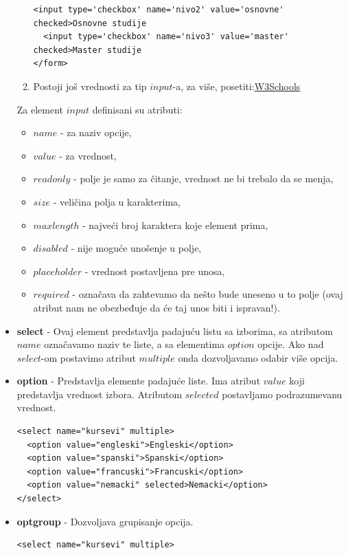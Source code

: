 \begin{itemize}
\begin{enumerate}
\begin{lstlisting}[backgroundcolor = \color{lightgray}, breaklines=true]
  <input type='checkbox' name='nivo2' value='osnovne' checked>Osnovne studije
  <input type='checkbox' name='nivo3' value='master' checked>Master studije
</form>
		\end{lstlisting}
		\item Postoji još vrednosti za tip $input$-a, za više, posetiti:\href{https://www.w3schools.com/html/html_form_input_types.asp	}{W3Schools}
	\end{enumerate}
 	 Za element $input$ definisani su atributi:
 	 \begin{itemize}
 	 \item $name$ - za naziv opcije, 
 	 \item $value$ - za vrednost,
 	 \item $readonly$ - polje je samo za čitanje, vrednost ne bi trebalo da se menja, 
 	 \item $size$ - veličina polja u karakterima, 
 	 \item $maxlength$ - najveći broj karaktera koje element prima,
 	 \item $disabled$ - nije moguće unošenje u polje,
 	 \item $placeholder$ - vrednost postavljena pre unosa,
 	 \item $required$ - označava da zahtevamo da nešto bude uneseno u to polje (ovaj atribut nam ne obezbeđuje da će taj unos biti i ispravan!).
	\end{itemize} 	    
\item \textbf{select} - Ovaj element predstavlja padajuću listu sa izborima, sa atributom $name$ označavamo naziv te liste, a sa elementima $option$ opcije. Ako nad $select$-om postavimo atribut $multiple$ onda dozvoljavamo odabir više opcija.  
\item \textbf{option} - Predstavlja elemente padajuće liste. Ima atribut $value$ koji predstavlja vrednost izbora. Atributom $selected$ postavljamo podrazumevanu vrednost.
\begin{lstlisting}[backgroundcolor = \color{lightgray}, breaklines=true]
<select name="kursevi" multiple>
  <option value="engleski">Engleski</option>
  <option value="spanski">Spanski</option>
  <option value="francuski">Francuski</option>
  <option value="nemacki" selected>Nemacki</option>
</select>
\end{lstlisting}
\item \textbf{optgroup} - Dozvoljava grupisanje opcija.
\begin{lstlisting}[backgroundcolor = \color{lightgray}, breaklines=true]
<select name="kursevi" multiple>

\end{lstlisting}
\end{itemize}
